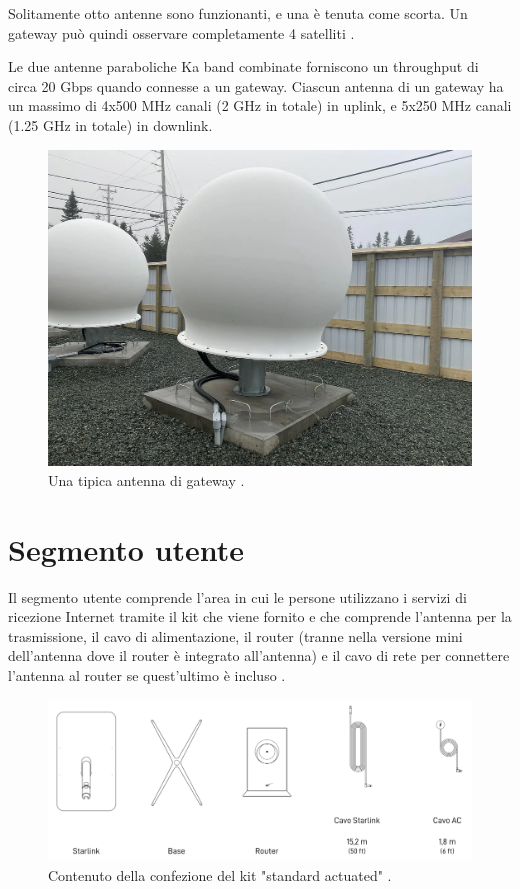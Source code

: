 Solitamente otto antenne sono funzionanti, e una è tenuta come scorta.
Un gateway può quindi osservare completamente 4 satelliti \cite{mike_puchol_modeling_2022}.

Le due antenne paraboliche \ac{Ka} band combinate forniscono un throughput di circa 20 Gbps quando connesse a un gateway.
Ciascun antenna di un gateway ha un massimo di 4x500 MHz canali (2 GHz in totale) in uplink, e 5x250 MHz canali (1.25 GHz in totale) in downlink.

\begin{figure}[htbp]
  \centering
  \includegraphics[width=0.9\linewidth]{./res/img/starlink_gateway_near.png}
  \caption{Una tipica antenna di gateway \cite{mike_puchol_modeling_2022}.}
  \label{fig:starlink-gateway-near}
\end{figure}

\section{Segmento utente}
Il segmento utente comprende l'area in cui le persone utilizzano i servizi di ricezione Internet tramite il kit che viene fornito e che comprende l'antenna per la trasmissione, il cavo di alimentazione, il router (tranne nella versione mini dell'antenna dove il router è integrato all'antenna) e il cavo di rete per connettere l'antenna al router se quest'ultimo è incluso \cite{branch_education_how_2022}.

\begin{figure}[htbp]
  \centering
  \includegraphics[width=0.8\linewidth]{./res/img/starlink_kit_standard.png}
  \caption{Contenuto della confezione del kit "standard actuated" \cite{starlink_specifiche_nodate}.}
  \label{fig:starlink-kit-standard}
\end{figure}

